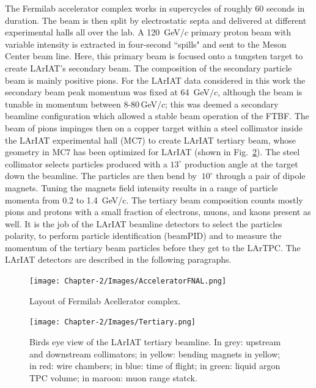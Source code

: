 The Fermilab accelerator complex works in supercycles of roughly 60 seconds in duration. The beam is then split by electrostatic septa and delivered at different experimental halls all over the lab. A 120~GeV$/c$ primary proton beam with variable intensity is extracted in four-second ``spills" and sent to the Meson Center beam line. Here, this primary beam is focused onto a tungsten target to create LArIAT's secondary beam. The composition of the secondary particle beam is mainly positive pions. For the LArIAT data considered in this work the secondary beam peak momentum was fixed at 64~GeV$/c$, although the beam is tunable in momentum between 8-80\,GeV$/c$; this was deemed a secondary beamline configuration which allowed a stable beam operation of the FTBF.
The beam of pions impinges then on a copper target within a steel collimator inside the LArIAT experimental hall (MC7) to create LArIAT tertiary beam, whose geometry in MC7 has been optimized for LArIAT (shown in  Fig.~\ref{fig:tert-layout}).   The steel collimator selects particles produced with a $13^\circ$ production angle at the target down the beamline.  The particles are then bend by  $~10^\circ$  through a pair of dipole magnets.  Tuning the magnets field intensity results in a range of particle momenta from 0.2 to 1.4~GeV/c.
The tertiary beam composition counts mostly pions and protons with a small fraction of electrons, muons, and kaons present as well. It is the job of the LArIAT beamline detectors to select the particles polarity,  to perform particle identification (beamPID) and to measure the momentum of the tertiary beam particles before they get to the LArTPC. The LArIAT detectors are described in the following paragraphs.  

\begin{figure}
  \centering  	
\texttt{[image: Chapter-2/Images/AcceleratorFNAL.png]}
\label{fig:Accelerator}
\caption{Layout of Fermilab Acellerator complex.}
\end{figure}

\begin{figure}
  \centering  	
\texttt{[image: Chapter-2/Images/Tertiary.png]}
\label{fig:tert-layout}
\caption{Birds eye view of the LArIAT tertiary beamline. In grey: upstream and downstream collimators; in yellow: bending magnets in yellow; in red: wire chambers; in blue: time of flight; in green: liquid argon TPC volume; in maroon: muon range statck.}
\end{figure}


